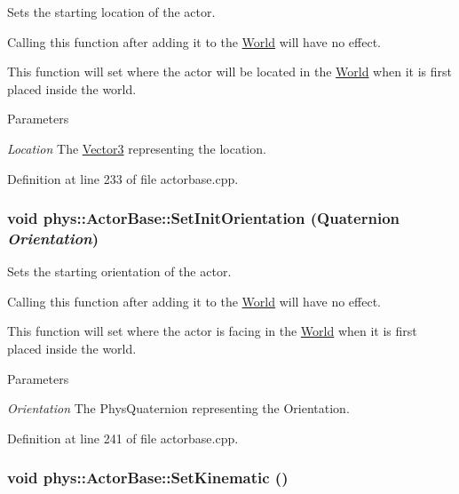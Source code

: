 Sets the starting location of the actor. 

Calling this function after adding it to the \hyperlink{classphys_1_1World}{World} will have no effect. \par
 This function will set where the actor will be located in the \hyperlink{classphys_1_1World}{World} when it is first placed inside the world. 
\begin{DoxyParams}{Parameters}
\item[{\em Location}]The \hyperlink{classphys_1_1Vector3}{Vector3} representing the location. \end{DoxyParams}


Definition at line 233 of file actorbase.cpp.

\hypertarget{classphys_1_1ActorBase_a681186465db767954ca3f9530a1d7c36}{
\subsubsection[{SetInitOrientation}]{\setlength{\rightskip}{0pt plus 5cm}void phys::ActorBase::SetInitOrientation ({\bf Quaternion} {\em Orientation})}}
\label{d8/d0f/classphys_1_1ActorBase_a681186465db767954ca3f9530a1d7c36}


Sets the starting orientation of the actor. 

Calling this function after adding it to the \hyperlink{classphys_1_1World}{World} will have no effect. \par
 This function will set where the actor is facing in the \hyperlink{classphys_1_1World}{World} when it is first placed inside the world. 
\begin{DoxyParams}{Parameters}
\item[{\em Orientation}]The PhysQuaternion representing the Orientation. \end{DoxyParams}


Definition at line 241 of file actorbase.cpp.

\hypertarget{classphys_1_1ActorBase_acd5613286ec14fb2a8e5ed5f5003dc5f}{
\subsubsection[{SetKinematic}]{\setlength{\rightskip}{0pt plus 5cm}void phys::ActorBase::SetKinematic ()}}
\label{d8/d0f/classphys_1_1ActorBase_acd5613286ec14fb2a8e5ed5f5003dc5f}


